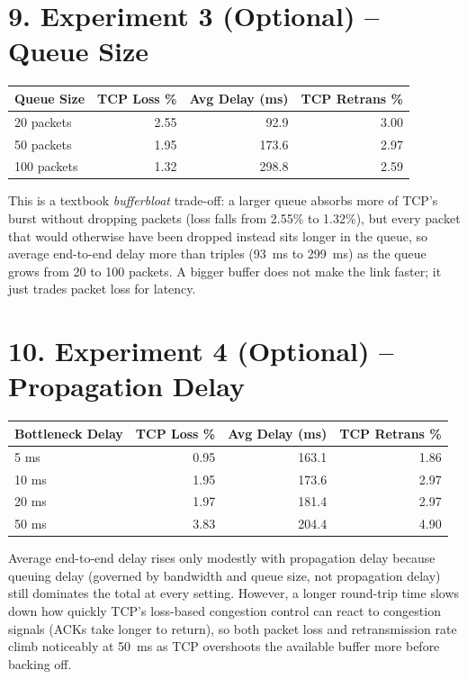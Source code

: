 \documentclass[11pt]{article}
\begin{document}
\section*{9. Experiment 3 (Optional) -- Queue Size}
\begin{center}
\renewcommand{\arraystretch}{1.2}
\begin{tabular}{lrrr}
\toprule
\textbf{Queue Size} & \textbf{TCP Loss \%} & \textbf{Avg Delay (ms)} & \textbf{TCP Retrans \%} \\
\midrule
20 packets  & 2.55 & 92.9  & 3.00 \\
50 packets  & 1.95 & 173.6 & 2.97 \\
100 packets & 1.32 & 298.8 & 2.59 \\
\bottomrule
\end{tabular}
\end{center}
This is a textbook \emph{bufferbloat} trade-off: a larger queue absorbs more
of TCP's burst without dropping packets (loss falls from 2.55\% to 1.32\%),
but every packet that would otherwise have been dropped instead sits longer
in the queue, so average end-to-end delay more than triples (93~ms to
299~ms) as the queue grows from 20 to 100 packets. A bigger buffer does not
make the link faster; it just trades packet loss for latency.

\section*{10. Experiment 4 (Optional) -- Propagation Delay}
\begin{center}
\renewcommand{\arraystretch}{1.2}
\begin{tabular}{lrrr}
\toprule
\textbf{Bottleneck Delay} & \textbf{TCP Loss \%} & \textbf{Avg Delay (ms)} & \textbf{TCP Retrans \%} \\
\midrule
5 ms  & 0.95 & 163.1 & 1.86 \\
10 ms & 1.95 & 173.6 & 2.97 \\
20 ms & 1.97 & 181.4 & 2.97 \\
50 ms & 3.83 & 204.4 & 4.90 \\
\bottomrule
\end{tabular}
\end{center}
Average end-to-end delay rises only modestly with propagation delay because
queuing delay (governed by bandwidth and queue size, not propagation delay)
still dominates the total at every setting. However, a longer round-trip
time slows down how quickly TCP's loss-based congestion control can react
to congestion signals (ACKs take longer to return), so both packet loss and
retransmission rate climb noticeably at 50~ms as TCP overshoots the
available buffer more before backing off.
\end{document}
